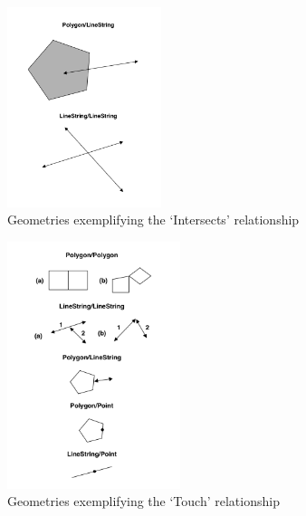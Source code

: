 \begin{figure}
    \centering

    \includegraphics[width=0.4\textwidth]{figures/crosses.png}
    
    \caption{Geometries exemplifying the `Intersects' relationship}
    \label{fig:intersects}
    
\end{figure}

\begin{figure}
    \centering

    \includegraphics[width=0.45\textwidth]{figures/touches.png}
    
    \caption{Geometries exemplifying the `Touch' relationship}
    \label{fig:touches}
    
\end{figure}

